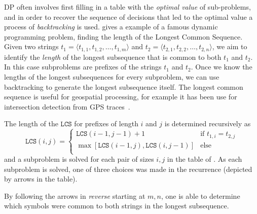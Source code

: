\ac{DP} often involves first filling in a table with the \textit{optimal value} of sub-problems, and
in order to recover the sequence of decisions that led to the optimal value a process of \textit{backtracking} is used. 
 gives a example of a famous dynamic programming problem, finding the length of the Longest Common Sequence. 
Given two strings $t_1=\langle t_{1,1}, t_{1,2}, \dots, t_{1,m}\rangle$
and $t_2=\langle t_{2,1}, t_{2,2}, \dots, t_{2,n}\rangle$, we aim to identify 
the \textit{length} of the longest subsequence that is common to both $t_1$ and $t_2$.
In this case subproblems are prefixes of the strings $t_1$ and $t_2$.
Once we know the lengths of the longest subsequences for every subproblem, we can use 
backtracking to generate the longest subsequence itself. 
The longest common sequence is useful for geospatial processing, for example it has been use for intersection detection from GPS
traces~\cite{Xie2017DetectingRI}.

The length of the $\mathtt{LCS}$ for prefixes of length $i$ and $j$ is determined recursively as
$$
\mathtt{LCS}(i, j) = \begin{cases}
\mathtt{LCS}(i - 1, j - 1) + 1 & \text{if $t_{1, i} = t_{2,j}$}\\
\max\left[
\mathtt{LCS}(i-1, j),
\mathtt{LCS}(i, j-1)
\right] 
& \text{else}\\
\end{cases}
$$
and a subproblem is solved for each pair of sizes $i,j$ in the table of .
As each subproblem is solved, one of three choices was made in the recurrence (depicted by arrows in the table). 

By following the arrows in \textit{reverse} starting at $m,n$, one is able to determine which
 symbols were common to both strings in the longest subsequence. 


